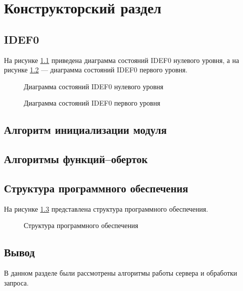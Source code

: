 \chapter{Конструкторский раздел}
\label{cha:design}

\section{IDEF0}

На рисунке \ref{fig:idef0} приведена диаграмма состояний IDEF0 нулевого уровня, а на рисунке \ref{fig:idef1} --- диаграмма состояний IDEF0 первого уровня.

\begin{figure}[ph!]
	\caption{Диаграмма состояний IDEF0 нулевого уровня}
	\label{fig:idef0}
\end{figure}

\begin{figure}[ph!]
	\caption{Диаграмма состояний IDEF0 первого уровня}
	\label{fig:idef1}
\end{figure}

\clearpage

\section{Алгоритм инициализации модуля}

\section{Алгоритмы функций--оберток}

\section{Структура программного обеспечения}

На рисунке \ref{fig:struct} представлена структура программного обеспечения.

\begin{figure}[ph!]
	\caption{Структура программного обеспечения}
	\label{fig:struct}
\end{figure}

\section*{Вывод}
В данном разделе были рассмотрены алгоритмы работы сервера и обработки запроса.


